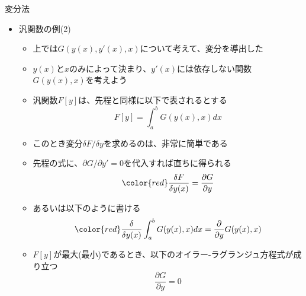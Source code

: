 \documentclass[dvipdfmx,notheorems,t]{beamer}
\begin{document}
\begin{frame}{変分法}

\begin{itemize}
	\item 汎関数の例(2)
	\begin{itemize}
		\item 上では$G(y(x), y'(x), x)$について考えて、変分を導出した
		\item $y(x)$と$x$のみによって決まり、$y'(x)$には依存しない関数\color{red}$G(y(x), x)$\normalcolor を考えよう
		\newline
		\item 汎関数$F[y]$は、先程と同様に以下で表されるとする
		\begin{equation}
			F[y] = \int_a^b G(y(x), x) dx
		\end{equation}
		
		\item このとき変分$\delta F/\delta y$を求めるのは、非常に簡単である
		\item 先程の式に、$\partial G/\partial y' = 0$を代入すれば直ちに得られる
		\begin{equation}
			\color{red}\frac{\delta F}{\delta y(x)} = \frac{\partial G}{\partial y}\normalcolor
		\end{equation}
		
		\item あるいは以下のように書ける
		\begin{equation}
			\color{red}\frac{\delta}{\delta y(x)} \int_a^b G(y(x), x) dx = \frac{\partial}{\partial y} G(y(x), x)\normalcolor
		\end{equation}
		
		\item $F[y]$が最大(最小)であるとき、以下のオイラー-ラグランジュ方程式が成り立つ
		\begin{equation}
			\frac{\partial G}{\partial y} = 0
		\end{equation}
	\end{itemize}
\end{itemize}

\end{frame}
\end{document}
